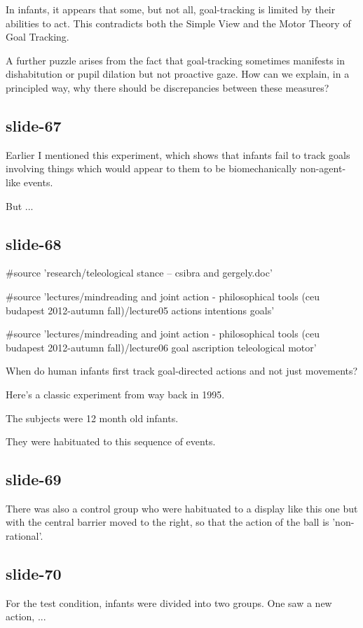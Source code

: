 \documentclass[12pt,\papersize]{extarticle}
\begin{document}
In infants,
it appears that
some,
but not all,
goal-tracking is limited by their abilities to act.
This contradicts both the Simple View and the Motor Theory of Goal Tracking.

A further puzzle arises from the fact that goal-tracking sometimes manifests in dishabitution or
pupil dilation but not proactive gaze.
How can we explain, in a principled way, why there should be discrepancies between these measures?
 
\subsection{slide-67}
Earlier I mentioned this experiment, which shows that infants 
fail to track goals involving things which would appear to them to be 
biomechanically non-agent-like events.

But ...
 
\subsection{slide-68}
\#source 'research/teleological stance -- csibra and gergely.doc'
 
\#source 'lectures/mindreading and joint action - philosophical tools (ceu budapest 2012-autumn fall)/lecture05 actions intentions goals'
 
\#source 'lectures/mindreading and joint action - philosophical tools (ceu budapest 2012-autumn fall)/lecture06 goal ascription teleological motor'
 
When do human infants first track goal-directed actions and not just movements?
 
Here's a classic experiment from way back in 1995.
 
The subjects were 12 month old infants.
 
They were habituated to this sequence of events.
 
\subsection{slide-69}
There was also a control group who were habituated to a display like this
one but with the central barrier moved to the right, so that the action
of the ball is 'non-rational'.
 
\subsection{slide-70}
For the test condition, infants were divided into two groups.  One saw a new action, ...
 
\end{document}

